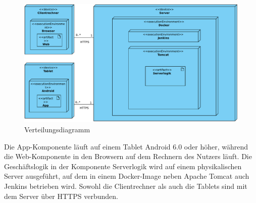 \begin{figure}[h]
	\centering
	\includegraphics[width=\textwidth]{img/Diagramme/Verteilung}		
	\caption{Verteilungsdiagramm}
	\label{fig:verteilungsdiagramm}
\end{figure}
\noindent
Die App-Komponente läuft auf einem Tablet Android 6.0 oder höher, während 
die Web-Komponente  in den Browsern auf dem Rechnern des Nutzers läuft.
Die Geschäftslogik in der Komponente Serverlogik wird auf einem physikalischen Server ausgeführt, auf dem in einem Docker-Image neben Apache Tomcat auch Jenkins betrieben wird.
Sowohl die Clientrechner als auch die Tablets sind mit dem Server über HTTPS verbunden.